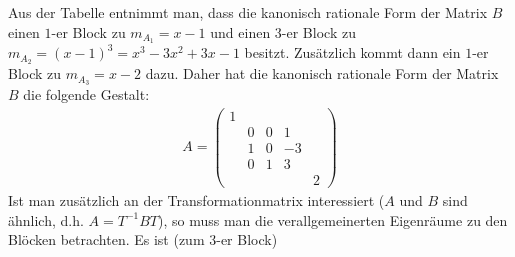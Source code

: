     Aus der Tabelle entnimmt man, dass die kanonisch rationale Form der Matrix $B$ einen $1$-er Block 
    zu $m_{A_1} = x-1$ und einen $3$-er Block zu $m_{A_2} = (x-1)^3 = x^3-3x^2+3x-1$ besitzt.
    Zusätzlich kommt dann ein $1$-er Block zu $m_{A_3} = x-2$ dazu.
    Daher hat die kanonisch rationale Form der Matrix $B$ die folgende Gestalt:
    \begin{align*}
        A =
        \begin{pmatrix}
            1 & & & & \\
            & 0 & 0 & 1 & \\
            & 1 & 0 & -3 & \\ 
            & 0 & 1 & 3 & \\ 
            & &  & & 2
        \end{pmatrix}
    \end{align*}
    Ist man zusätzlich an der Transformationmatrix interessiert ($A$ und $B$ sind ähnlich, d.h. $A=T^{-1}BT$),
    so muss man die verallgemeinerten Eigenräume zu den Blöcken betrachten.
    Es ist (zum $3$-er Block)

